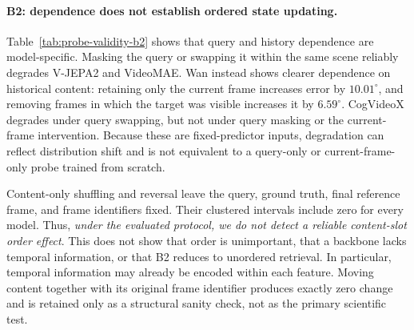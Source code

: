 \paragraph{B2: dependence does not establish ordered state updating.}
Table~\ref{tab:probe-validity-b2} shows that query and history dependence are
model-specific.  Masking the query or swapping it within the same scene
reliably degrades V-JEPA2 and VideoMAE.  Wan instead shows clearer dependence
on historical content: retaining only the current frame increases error by
$10.01^{\circ}$, and removing frames in which the target was visible increases
it by $6.59^{\circ}$.  CogVideoX degrades under query swapping, but not under
query masking or the current-frame intervention.  Because these are
fixed-predictor inputs, degradation can reflect distribution shift and is not
equivalent to a query-only or current-frame-only probe trained from scratch.

Content-only shuffling and reversal leave the query, ground truth, final
reference frame, and frame identifiers fixed.  Their clustered intervals
include zero for every model.  Thus, \emph{under the evaluated protocol, we do
not detect a reliable content-slot order effect}.  This does not show that
order is unimportant, that a backbone lacks temporal information, or that B2
reduces to unordered retrieval.  In particular, temporal information may
already be encoded within each feature.  Moving content together with its
original frame identifier produces exactly zero change and is retained only as
a structural sanity check, not as the primary scientific test.

